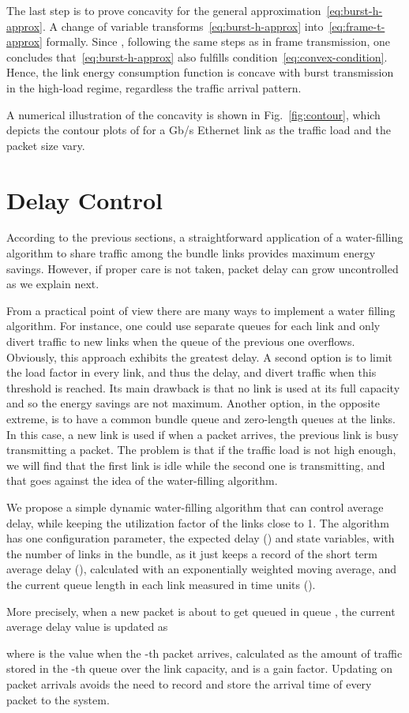 \documentclass[journal,english,twocolumn,10pt,letterpaper]{IEEEtran}
\newcommand{\added}[1]{{#1}}
\begin{document}
The last step is to prove concavity for the general
approximation~\eqref{eq:burst-h-approx}. A change of variable 
transforms~\eqref{eq:burst-h-approx} into~\eqref{eq:frame-t-approx} formally.
Since , following the same steps as in frame transmission, one
concludes that~\eqref{eq:burst-h-approx} also fulfills
condition~\eqref{eq:convex-condition}. Hence, the link energy consumption
function  is concave with burst transmission in the high-load
regime, regardless the traffic arrival pattern.

A numerical illustration of the concavity is shown in
\added{Fig.}~\ref{fig:contour}, which depicts the contour plots of
 for a  Gb/s Ethernet link as the traffic load and
the packet size vary.

\section{Delay Control}
\label{sec:delay-control}

According to the previous sections, a straightforward application of a
water-filling algorithm to share traffic among the bundle links provides
maximum energy savings. However, if proper care is not taken, packet delay can
grow uncontrolled as we explain next.

From a practical point of view there are many ways to implement a water
filling algorithm. For instance, one could use separate queues for each link
and only divert traffic to new links when the queue of the previous one
overflows. Obviously, this approach exhibits the greatest delay. A second
option is to limit the load factor in every link, and thus the delay, and
divert traffic when this \added{threshold} is reached. Its main drawback is
that no link is used at its full capacity and so the energy savings are not
maximum. Another option, in the opposite extreme, is to have a common bundle
queue and zero-length queues at the links. In this case, a new link is used if
when a packet arrives, the previous link is busy transmitting a packet. The
problem is that if the traffic load is not high enough, we will find that the
first link is idle while the second one is transmitting, and that goes against
the idea of the water-filling algorithm.

We propose a simple dynamic water-filling algorithm that can control average
delay, while keeping the utilization factor of the links close to 1. The
algorithm has one configuration parameter, the expected delay () and
 state variables, with  the number of links in the bundle, as it just
keeps a record of the short term average delay (), calculated with an
exponentially weighted moving average, and the current queue length in each
link measured in time units (). \added{More precisely, when a
new packet is about to get queued in queue , the current average delay value
 is updated as

where  is the  value when the -th packet arrives, calculated as the
amount of traffic stored in the -th queue over the link capacity, and
 is a gain factor. Updating  on packet arrivals avoids the need
to record and store the arrival time of every packet to the system.}
\end{document}

